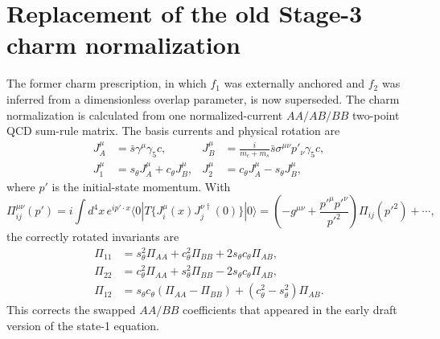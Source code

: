 \documentclass[11pt]{article}
\begin{document}
\clearpage
\section{Replacement of the old Stage-3 charm normalization}

The former charm prescription, in which $f_1$ was externally anchored and
$f_2$ was inferred from a dimensionless overlap parameter, is now superseded.
The charm normalization is calculated from one normalized-current
$AA/AB/BB$ two-point QCD sum-rule matrix.  The basis currents and physical
rotation are
\begin{align}
J_A^\mu&=\bar s\gamma^\mu\gamma_5c,
&J_B^\mu&=\frac{i}{m_c+m_s}\bar s\sigma^{\mu\nu}p'_\nu\gamma_5c,\\
J_1^\mu&=s_\theta J_A^\mu+c_\theta J_B^\mu,
&J_2^\mu&=c_\theta J_A^\mu-s_\theta J_B^\mu,
\end{align}
where $p'$ is the initial-state momentum.  With
\begin{equation}
\Pi_{ij}^{\mu\nu}(p')=i\int d^4x\,e^{ip'\cdot x}
\langle0|T\{J_i^\mu(x)J_j^{\nu\dagger}(0)\}|0\rangle
=\left(-g^{\mu\nu}+\frac{p'^\mu p'^\nu}{p'^2}\right)\Pi_{ij}(p'^2)+\cdots,
\end{equation}
the correctly rotated invariants are
\begin{align}
\Pi_{11}&=s_\theta^2\Pi_{AA}+c_\theta^2\Pi_{BB}
 +2s_\theta c_\theta\Pi_{AB},\\
\Pi_{22}&=c_\theta^2\Pi_{AA}+s_\theta^2\Pi_{BB}
 -2s_\theta c_\theta\Pi_{AB},\\
\Pi_{12}&=s_\theta c_\theta(\Pi_{AA}-\Pi_{BB})
 +(c_\theta^2-s_\theta^2)\Pi_{AB}.
\end{align}
This corrects the swapped $AA/BB$ coefficients that appeared in the early
draft version of the state-1 equation.
\end{document}
